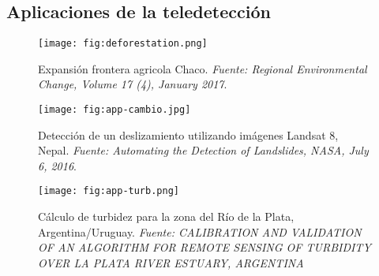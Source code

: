 
\subsection{Aplicaciones de la teledetección}

\begin{frame}{}
  \begin{figure}
    \centering
    \texttt{[image: fig:deforestation.png]}
    \caption{Expansión frontera agricola Chaco. \emph{Fuente: Regional Environmental Change, Volume 17 (4), January 2017}.}
    \label{}
  \end{figure}
\end{frame}

\begin{frame}{}
  \begin{figure}
    \centering
    \texttt{[image: fig:app-cambio.jpg]}
    \caption{Detección de un deslizamiento utilizando imágenes Landsat 8, Nepal. \emph{Fuente: Automating the Detection of Landslides, NASA, July 6, 2016}.}
    \label{}
  \end{figure}
\end{frame}

\begin{frame}{}
  \begin{figure}
    \centering
    \texttt{[image: fig:app-turb.png]}
    \caption{Cálculo de turbidez para la zona del Río de la Plata, Argentina/Uruguay. \emph{Fuente: CALIBRATION AND VALIDATION OF AN ALGORITHM FOR REMOTE SENSING OF TURBIDITY OVER LA PLATA RIVER ESTUARY, ARGENTINA}}
    \label{}
  \end{figure}
\end{frame}

